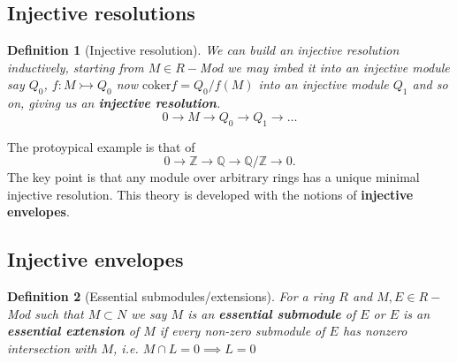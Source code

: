 \documentclass[12pt]{article}
\numberwithin{equation}{section}
\newcommand{\Q}{\mathbb{Q}}
\newcommand{\Z}{\mathbb{Z}}
\newtheorem{definition}{Definition}[section]
\begin{document}
	\subsection{Injective resolutions}	
	\begin{definition}[Injective resolution]
		We can build an injective resolution inductively, starting from $M\in R-$Mod we may imbed it into an injective module say $Q_0$, $f: M \rightarrowtail Q_0$ now $\mathrm{coker}f=Q_0/f(M)$ into an injective module $Q_1$ and so on, giving us an \textbf{injective resolution}.
		\[ 0 \to M \to Q_0 \to Q_1 \to \dots \]
	\end{definition}
	The protoypical example is that of \[ 0 \to \Z \to \Q \to \Q/\Z \to 0 .\]
	The key point is that any module over arbitrary rings has a unique minimal injective resolution. This theory is developed with the notions of \textbf{injective envelopes}.
	
	\subsection{Injective envelopes}
	\begin{definition}[Essential submodules/extensions]
		For a ring $R$ and $M,E \in R-$Mod such that $M \subset N$ we say $M$ is an \textbf{essential submodule} of $E$ or $E$ is an \textbf{essential extension} of $M$ if every non-zero submodule of $E$ has nonzero intersection with $M$, i.e. $ M \cap L =0 \implies L =0$
\end{definition}
\end{document}
